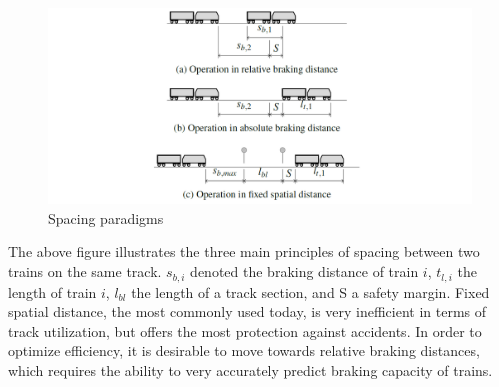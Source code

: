 \begin{figure}[H]
	\centering
	\includegraphics[width=\linewidth]{./pic/abstaende}
	\caption{Spacing paradigms}
	\label{fig:train_spacing}
\end{figure}

\par\noindent
The above figure illustrates the three main principles of spacing between two trains on the same track. $s_{b,i}$ denoted the braking distance of train $i$, $t_{l,i}$ the length of train $i$, $l_{bl}$ the length of a track section, and S a safety margin. Fixed spatial distance, the most commonly used today, is very inefficient in terms of track utilization, but offers the most protection against accidents. In order to optimize efficiency, it is desirable to move towards relative braking distances, which requires the ability to very accurately predict braking capacity of trains.

